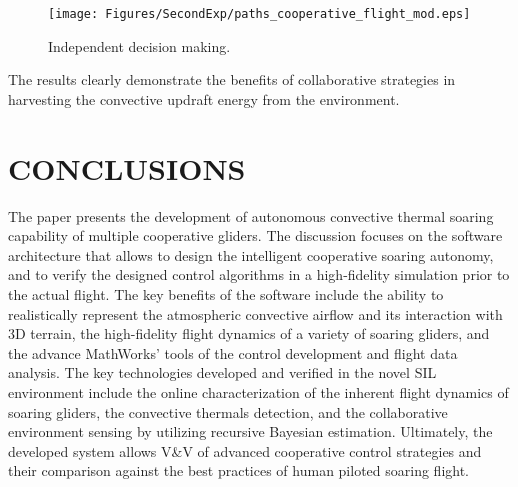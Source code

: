\documentclass[letterpaper, 10 pt, conference]{ieeeconf}  %
\newcommand{\squeezeup}{\vspace{-1.0mm}}
\begin{document}
\begin{figure}[thpb]
  \centering
  \texttt{[image: Figures/SecondExp/paths\_cooperative\_flight\_mod.eps]}
  \caption{Independent decision making.}
  \label{fig:CoopFlightIndependentDecision}
\end{figure}
The results clearly demonstrate the benefits of collaborative strategies in harvesting the convective updraft energy from the environment.

\section*{CONCLUSIONS}
The paper presents the development of autonomous convective thermal soaring capability of multiple cooperative gliders.
The discussion focuses on the software architecture that allows to design the intelligent cooperative soaring autonomy, and to verify the designed control algorithms in a high-fidelity simulation prior to the actual flight. The key benefits of the software include the ability to realistically represent the atmospheric convective airflow and its interaction with 3D terrain, the high-fidelity flight dynamics of a variety of soaring gliders, and the advance MathWorks' tools of the control development and flight data analysis. The key technologies developed and verified in the novel SIL environment include the online characterization of the inherent flight dynamics of soaring gliders, the convective thermals detection, and the collaborative environment sensing by utilizing recursive Bayesian estimation. Ultimately, the developed system allows V\&V of advanced cooperative control strategies and their comparison against the best practices of human piloted soaring flight.




\end{document}
